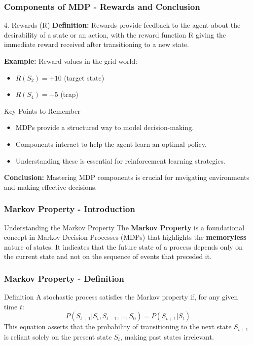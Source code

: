 \documentclass[aspectratio=169]{beamer}
\begin{document}
\begin{frame}[fragile]
    \frametitle{Components of MDP - Rewards and Conclusion}
    \begin{block}{4. Rewards (R)}
        \textbf{Definition:} Rewards provide feedback to the agent about the desirability of a state or an action, with the reward function R giving the immediate reward received after transitioning to a new state.
    \end{block}
    
    \textbf{Example:} Reward values in the grid world:
    \begin{itemize}
        \item \( R(S_2) = +10 \) (target state)
        \item \( R(S_4) = -5 \) (trap)
    \end{itemize}

    \begin{block}{Key Points to Remember}
        \begin{itemize}
            \item MDPs provide a structured way to model decision-making.
            \item Components interact to help the agent learn an optimal policy.
            \item Understanding these is essential for reinforcement learning strategies.
        \end{itemize}
    \end{block}
    
    \textbf{Conclusion:} Mastering MDP components is crucial for navigating environments and making effective decisions.
\end{frame}

\begin{frame}[fragile]
  \frametitle{Markov Property - Introduction}
  \begin{block}{Understanding the Markov Property}
    The \textbf{Markov Property} is a foundational concept in Markov Decision Processes (MDPs) that highlights the \textbf{memoryless} nature of states. It indicates that the future state of a process depends only on the current state and not on the sequence of events that preceded it.
  \end{block}
\end{frame}

\begin{frame}[fragile]
  \frametitle{Markov Property - Definition}
  \begin{block}{Definition}
    A stochastic process satisfies the Markov property if, for any given time \( t \):
    \begin{equation}
      P(S_{t+1} | S_t, S_{t-1}, \ldots, S_0) = P(S_{t+1} | S_t)
    \end{equation}
    This equation asserts that the probability of transitioning to the next state \( S_{t+1} \) is reliant solely on the present state \( S_t \), making past states irrelevant.
  \end{block}
\end{frame}
\end{document}
